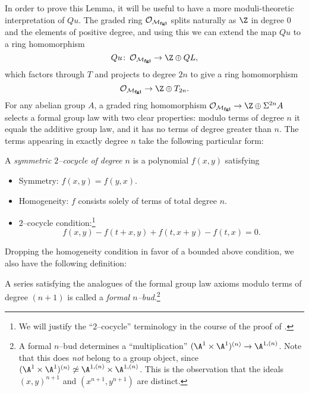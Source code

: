 In order to prove this Lemma, it will be useful to have a more moduli-theoretic interpretation of \(Qu\).  The graded ring \(\mathcal{O}_{\mathcal{M}_{\mathbf{fgl}}}\) splits naturally as \(\Z\) in degree \(0\) and the elements of positive degree, and using this we can extend the map \(Qu\) to a ring homomorphism \[Qu\co \sheaf O_{\moduli{fgl}} \to \Z \oplus QL,\] which factors through \(T\) and projects to degree \(2n\) to give a ring homomorphism \[\sheaf O_{\moduli{fgl}} \to \Z \oplus T_{2n}.\]  For any abelian group \(A\), a graded ring homomorphism \(\sheaf O_{\moduli{fgl}} \to \Z \oplus \Susp^{2n} A\) selects a formal group law with two clear properties: modulo terms of degree \(n\) it equals the additive group law, and it has no terms of degree greater than \(n\).  The terms appearing in exactly degree \(n\) take the following particular form:

\begin{definition}\label{DefinitionSymmetric2Cocycle}
A \textit{symmetric \(2\)--cocycle of degree \(n\)} is a polynomial \(f(x, y)\) satisfying
\begin{itemize}
    \item Symmetry: \(f(x, y) = f(y, x)\).
    \item Homogeneity: \(f\) consists solely of terms of total degree \(n\).
    \item \(2\)--cocycle condition:\footnote{We will justify the ``\(2\)--cocycle'' terminology in the course of the proof of .} \[f(x, y) - f(t + x, y) + f(t, x + y) - f(t, x) = 0.\]
\end{itemize}
\end{definition}

Dropping the homogeneity condition in favor of a bounded above condition, we also have the following definition:
\begin{definition}
A series satisfying the analogues of the formal group law axioms modulo terms of degree \((n+1)\) is called a \textit{formal \(n\)--bud}.\footnote{A formal \(n\)--bud determines a ``multiplication'' \((\A^1 \times \A^1)^{(n)} \to \A^{1,(n)}\).  Note that this does \emph{not} belong to a group object, since \((\A^1 \times \A^1)^{(n)} \not\simeq \A^{1,(n)} \times \A^{1,(n)}\).  This is the observation that the ideals \((x, y)^{n+1}\) and \((x^{n+1}, y^{n+1})\) are distinct.}
\end{definition}

